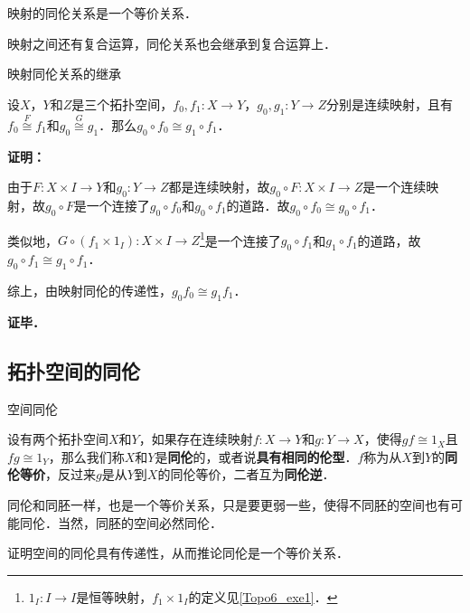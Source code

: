 \begin{theorem}{}
映射的同伦关系是一个等价关系．
\end{theorem}

映射之间还有复合运算，同伦关系也会继承到复合运算上．

\begin{theorem}{映射同伦关系的继承}

设$X$，$Y$和$Z$是三个拓扑空间，$f_0, f_1:X\rightarrow Y$，$g_0, g_1:Y\rightarrow Z$分别是连续映射，且有$f_0\overset{F}{\cong}f_1$和$g_0\overset{G}{\cong}g_1$．那么$g_0\circ f_0\cong g_1\circ f_1$．

\end{theorem}

\textbf{证明：}

由于$F:X\times I\rightarrow Y$和$g_0:Y\rightarrow Z$都是连续映射，故$g_0\circ F:X\times I\rightarrow Z$是一个连续映射，故$g_0\circ F$是一个连接了$g_0\circ f_0$和$g_0\circ f_1$的道路．故$g_0\circ f_0\cong g_0\circ f_1$．

类似地，$G\circ(f_1\times 1_I):X\times I\rightarrow Z$\footnote{$1_I:I\rightarrow I$是恒等映射，$f_1\times 1_I$的定义见\autoref{Topo6_exe1}．}是一个连接了$g_0\circ f_1$和$g_1\circ f_1$的道路，故$g_0\circ f_1\cong g_1\circ f_1$．

综上，由映射同伦的传递性，$g_0f_0\cong g_1f_1$．

\textbf{证毕．}

\subsection{拓扑空间的同伦}

\begin{definition}{空间同伦}

设有两个拓扑空间$X$和$Y$，如果存在连续映射$f:X\rightarrow Y$和$g:Y\rightarrow X$，使得$gf\cong 1_X$且$fg\cong 1_Y$，那么我们称$X$和$Y$是\textbf{同伦}的，或者说\textbf{具有相同的伦型}．$f$称为从$X$到$Y$的\textbf{同伦等价}，反过来$g$是从$Y$到$X$的同伦等价，二者互为\textbf{同伦逆}．

\end{definition}

同伦和同胚一样，也是一个等价关系，只是要更弱一些，使得不同胚的空间也有可能同伦．当然，同胚的空间必然同伦．

\begin{exercise}{}
证明空间的同伦具有传递性，从而推论同伦是一个等价关系．
\end{exercise}


